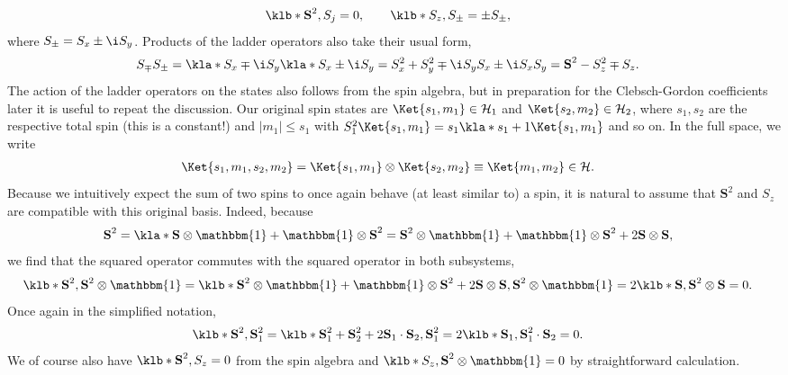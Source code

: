 \documentclass[english, parskip=full]{scrartcl}
\begin{document}
\begin{align}
\klb*{\textbf{S}^2, S_j} &= 0, \qquad \klb*{S_z, S_\pm} = \pm S_\pm,
\end{align}
where $S_\pm = S_x \pm \i S_y$.
Products of the ladder operators also take their usual form,
\begin{align}
S_\mp S_\pm &= \kla*{S_x \mp \i S_y} \kla*{S_x \pm \i S_y} = S_x^2 + S_y^2 \mp \i S_y S_x \pm \i S_x S_y = \textbf{S}^2 - S_z^2 \mp S_z.
\end{align}
The action of the ladder operators on the states also follows from the spin algebra, but in preparation for the Clebsch-Gordon coefficients later it is useful to repeat the discussion.
Our original spin states are $\Ket{s_1,m_1} \in \mathcal{H}_1$ and $\Ket{s_2,m_2} \in \mathcal{H}_2$, where $s_1,s_2$ are the respective total spin (this is a constant!) and $|m_1|\le s_1$ with $S_1^2 \Ket{s_1,m_1} = s_1\kla*{s_1+1}\Ket{s_1,m_1}$ and so on.
In the full space, we write
\begin{align}
\Ket{s_1,m_1,s_2,m_2} &= \Ket{s_1,m_1} \otimes \Ket{s_2,m_2} \equiv \Ket{m_1,m_2} \in \mathcal{H}.
\end{align}
Because we intuitively expect the sum of two spins to once again behave (at least similar to) a spin, it is natural to assume that $\textbf{S}^2$ and $S_z$ are compatible with this original basis.
Indeed, because
\begin{align}
\textbf{S}^2 &= \kla*{\textbf{S} \otimes \mathbbm{1} + \mathbbm{1} \otimes \textbf{S}}^2 = \textbf{S}^2 \otimes \mathbbm{1} + \mathbbm{1} \otimes \textbf{S}^2 + 2\textbf{S} \otimes \textbf{S},
\end{align}
we find that the squared operator commutes with the squared operator in both subsystems,
\begin{align}
\klb*{\textbf{S}^2, \textbf{S}^2 \otimes \mathbbm{1}} &= \klb*{\textbf{S}^2 \otimes \mathbbm{1} + \mathbbm{1} \otimes \textbf{S}^2 + 2\textbf{S} \otimes \textbf{S}, \textbf{S}^2 \otimes \mathbbm{1}} = 2\klb*{\textbf{S}, \textbf{S}^2} \otimes \textbf{S} = 0.
\end{align}
Once again in the simplified notation, 
\begin{align}
\klb*{\textbf{S}^2, \textbf{S}_1^2} &= \klb*{\textbf{S}_1^2 + \textbf{S}_2^2 + 2\textbf{S}_1 \cdot \textbf{S}_2, \textbf{S}_1^2} = 2\klb*{\textbf{S}_1, \textbf{S}_1^2} \cdot \textbf{S}_2 = 0.
\end{align}
We of course also have $\klb*{\textbf{S}^2,S_z} = 0$ from the spin algebra and $\klb*{S_z,\textbf{S}^2\otimes \mathbbm{1}} = 0$ by straightforward calculation.
\end{document}
